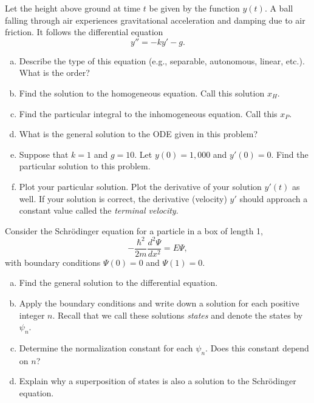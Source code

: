 \documentclass[12pt]{amsbook}
\begin{document}
\newpage
\begin{problem}
Let the height above ground at time $t$ be given by the function $y(t)$. A ball falling through air experiences gravitational acceleration and damping due to air friction. It follows the differential equation
\[
y'' = -ky' - g.
\]
\begin{enumerate}[(a)]
    \item Describe the type of this equation (e.g., separable, autonomous, linear, etc.). What is the order?
    \item Find the solution to the homogeneous equation. Call this solution $x_H$.
    \item Find the particular integral to the inhomogeneous equation. Call this $x_P$.
    \item What is the general solution to the ODE given in this problem?
    \item Suppose that $k=1$ and $g=10$. Let $y(0)=1,000$ and $y'(0)=0$. Find the particular solution to this problem.
    \item Plot your particular solution. Plot the derivative of your solution $y'(t)$ as well. If your solution is correct, the derivative (velocity) $y'$ should approach a constant value called the \emph{terminal velocity}.
\end{enumerate}
\end{problem}


\newpage
\begin{problem}
Consider the Schr\"odinger equation for a particle in a box of length 1,
\[
-\frac{\hbar^2}{2m}\frac{d^2 \Psi}{dx^2} = E\Psi,
\]
with boundary conditions $\Psi(0)=0$ and $\Psi(1)=0$.
\begin{enumerate}[(a)]
    \item Find the general solution to the differential equation.
    \item Apply the boundary conditions and write down a solution for each positive integer $n$. Recall that we call these solutions \emph{states} and denote the states by $\psi_n$.
    \item Determine the normalization constant for each $\psi_n$.  Does this constant depend on $n$?
    \item Explain why a superposition of states is also a solution to the Schr\"odinger equation.
\end{enumerate}
\end{problem}
\end{document}
